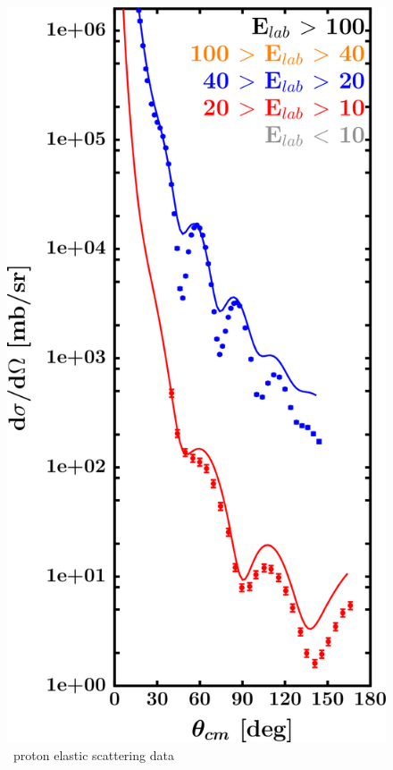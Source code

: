 \label{sn112DOMOutput}
\begin{figure}[H]
    \centering
    \begin{minipage}{0.45\textwidth}
        \centering
        \includegraphics[width=1.0\textwidth]{figures/sn112_protonElastic.png}
        \caption{\snTwelve\ proton elastic scattering data}

\end{minipage}
\end{figure}
